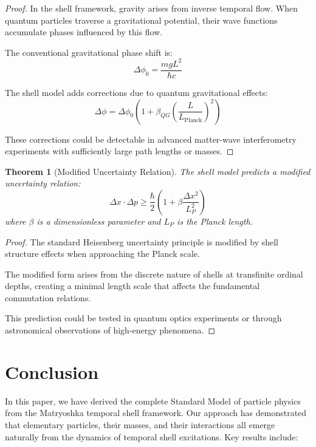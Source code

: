 \documentclass[12pt,a4paper]{article}
\newtheorem{theorem}{Theorem}[section]
\begin{document}
\begin{proof}
In the shell framework, gravity arises from inverse temporal flow. When quantum particles traverse a gravitational potential, their wave functions accumulate phases influenced by this flow.

The conventional gravitational phase shift is:
\begin{equation}
\Delta\phi_0 = \frac{m g L^2}{\hbar c}
\end{equation}

The shell model adds corrections due to quantum gravitational effects:
\begin{equation}
\Delta\phi = \Delta\phi_0 \left(1 + \beta_{QG} \left(\frac{L}{L_{\text{Planck}}}\right)^2\right)
\end{equation}

These corrections could be detectable in advanced matter-wave interferometry experiments with sufficiently large path lengths or masses.
\end{proof}

\begin{theorem}[Modified Uncertainty Relation]
\label{thm:modified-uncertainty}
The shell model predicts a modified uncertainty relation:
\begin{equation}
\Delta x \cdot \Delta p \geq \frac{\hbar}{2} \left(1 + \beta \frac{\Delta x^2}{L_P^2}\right)
\end{equation}
where $\beta$ is a dimensionless parameter and $L_P$ is the Planck length.
\end{theorem}

\begin{proof}
The standard Heisenberg uncertainty principle is modified by shell structure effects when approaching the Planck scale.

The modified form arises from the discrete nature of shells at transfinite ordinal depths, creating a minimal length scale that affects the fundamental commutation relations.

This prediction could be tested in quantum optics experiments or through astronomical observations of high-energy phenomena.
\end{proof}

\section{Conclusion}
\label{sec:conclusion}

In this paper, we have derived the complete Standard Model of particle physics from the Matryoshka temporal shell framework. Our approach has demonstrated that elementary particles, their masses, and their interactions all emerge naturally from the dynamics of temporal shell excitations. Key results include:
\end{document}

